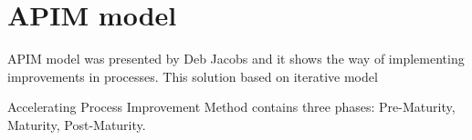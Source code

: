 \section{APIM model}


APIM model was presented by Deb Jacobs and it shows the way of implementing improvements in processes. This solution based on iterative model

Accelerating Process Improvement Method contains three phases: Pre-Maturity, Maturity, Post-Maturity. 
